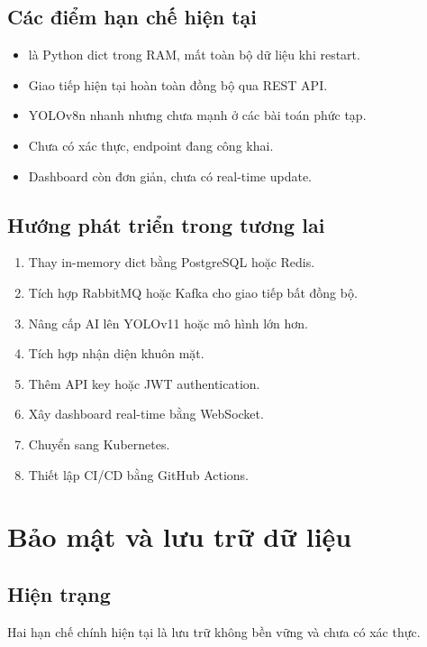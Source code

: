 \subsection{Các điểm hạn chế hiện tại}

\begin{itemize}
    \item {} là Python dict trong RAM, mất toàn bộ dữ liệu khi restart.
    \item Giao tiếp hiện tại hoàn toàn đồng bộ qua REST API.
    \item YOLOv8n nhanh nhưng chưa mạnh ở các bài toán phức tạp.
    \item Chưa có xác thực, endpoint đang công khai.
    \item Dashboard còn đơn giản, chưa có real-time update.
\end{itemize}

\subsection{Hướng phát triển trong tương lai}

\begin{enumerate}
    \item Thay in-memory dict bằng PostgreSQL hoặc Redis.
    \item Tích hợp RabbitMQ hoặc Kafka cho giao tiếp bất đồng bộ.
    \item Nâng cấp AI lên YOLOv11 hoặc mô hình lớn hơn.
    \item Tích hợp nhận diện khuôn mặt.
    \item Thêm API key hoặc JWT authentication.
    \item Xây dashboard real-time bằng WebSocket.
    \item Chuyển sang Kubernetes.
    \item Thiết lập CI/CD bằng GitHub Actions.
\end{enumerate}

\section{Bảo mật và lưu trữ dữ liệu}

\subsection{Hiện trạng}

Hai hạn chế chính hiện tại là lưu trữ không bền vững và chưa có xác thực.

